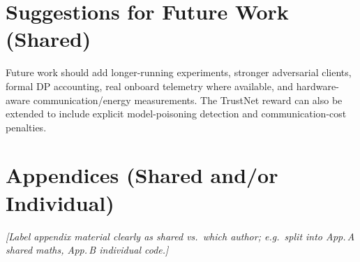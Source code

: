 \documentclass[11pt,a4paper,oneside]{report}
\begin{document}
\chapter{Suggestions for Future Work (Shared)}
\label{ch:future}

Future work should add longer-running experiments, stronger adversarial clients,
formal DP accounting, real onboard telemetry where available, and hardware-aware
communication/energy measurements. The TrustNet reward can also be extended to
include explicit model-poisoning detection and communication-cost penalties.

\printbibliography[heading=bibintoc,title={References (IEEE)}]

\appendix

\chapter{Appendices (Shared and/or Individual)}
\label{app:main}

\textit{[Label appendix material clearly as shared vs.\ which author; e.g.\ split into App.\,A shared maths, App.\,B individual code.]}
\end{document}
